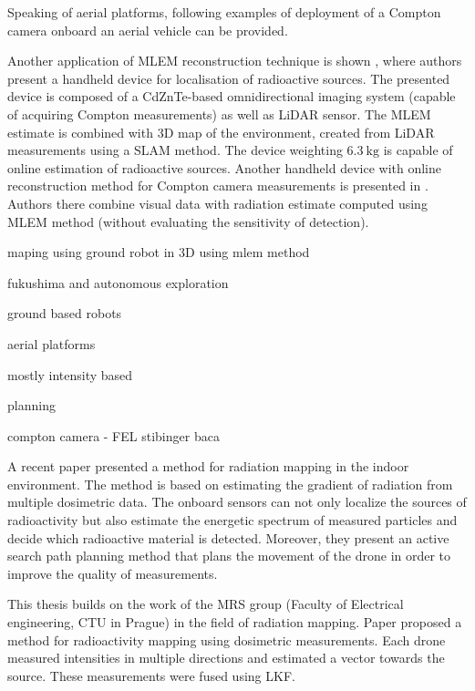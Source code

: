 
Speaking of aerial platforms, following examples of deployment of a Compton camera onboard an aerial vehicle can be provided.




Another application of \ac{MLEM} reconstruction technique is shown  \cite{handheld_mlem_reconstruction}, where authors present a handheld device for localisation of radioactive sources. 
The presented device is composed of a CdZnTe-based omnidirectional imaging system (capable of acquiring Compton measurements) as well as \ac{LiDAR} sensor.
The \ac{MLEM} estimate is combined with 3D map of the environment, created from \ac{LiDAR} measurements using a \ac{SLAM} method.
The device weighting $\SI{6.3}{\kilogram}$ is capable of online estimation of radioactive sources.
Another handheld device with online reconstruction method for Compton camera measurements is presented in \cite{handheld_visual}.
Authors there combine visual data with radiation estimate computed using \ac{MLEM} method (without evaluating the sensitivity of detection).




maping using ground robot in 3D using mlem method 




fukushima and autonomous exploration

ground based robots

aerial platforms

mostly intensity based

planning 

compton camera - FEL
stibinger
baca

A recent paper \cite{mascarich2022} presented a method for radiation mapping in the indoor environment.
The method is based on estimating the gradient of radiation from multiple dosimetric data.
The onboard sensors can not only localize the sources of radioactivity but also estimate the energetic spectrum of measured particles and decide which radioactive material is detected.
Moreover, they present an active search path planning method that plans the movement of the drone in order to improve the quality of measurements.


This thesis builds on the work of the MRS group (Faculty of Electrical engineering, CTU in Prague) in the field of radiation mapping. 
Paper \cite{stibinger2020} proposed a method for radioactivity mapping using dosimetric measurements.
Each drone measured intensities in multiple directions and estimated a vector towards the source. 
These measurements were fused using \ac{LKF}.

